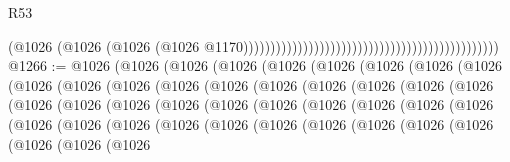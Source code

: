 \begin{lexlean}{R53}
\begin{coremodule}
                                                                                          (@1026
                                                                                            (@1026
                                                                                              (@1026
                                                                                                (@1026
                                                                                                  @1170)))))))))))))))))))))))))))))))))))))))))))))))
@1266 := @1026
    (@1026
      (@1026
        (@1026
          (@1026
            (@1026
              (@1026
                (@1026
                  (@1026
                    (@1026
                      (@1026
                        (@1026
                          (@1026
                            (@1026
                              (@1026
                                (@1026
                                  (@1026
                                    (@1026
                                      (@1026
                                        (@1026
                                          (@1026
                                            (@1026
                                              (@1026
                                                (@1026
                                                  (@1026
                                                    (@1026
                                                      (@1026
                                                        (@1026
                                                          (@1026
                                                            (@1026
                                                              (@1026
                                                                (@1026
                                                                  (@1026
                                                                    (@1026
                                                                      (@1026
                                                                        (@1026
                                                                          (@1026
                                                                            (@1026
                                                                              (@1026
                                                                                (@1026
                                                                                  (@1026
                                                                                    (@1026

\end{coremodule}
\end{lexlean}
